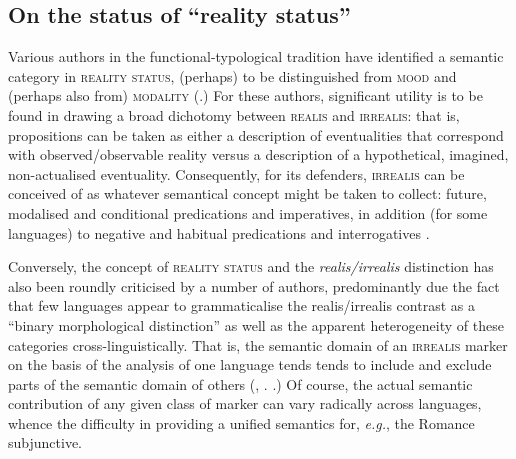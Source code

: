 \subsection{On the status of ``reality status''}
Various authors in the functional-typological tradition have identified a semantic category in \textsc{reality status}, (perhaps) to be distinguished from \textsc{mood} and (perhaps also from) \textsc{modality} (\citealp[see][]{Bowern1998,Elliott2000,Roberts1990a,Michael2014,McGregor2006,Mithun1995,Chafe1995}.) For these authors, significant utility is to be found in drawing a broad dichotomy between \textsc{realis} and \textsc{irrealis}: that is, propositions can be taken as either a description of eventualities that correspond with observed/observable reality versus a description of a hypothetical, imagined, non-actualised eventuality. Consequently, for its defenders, \textsc{irrealis} can be conceived of as whatever semantical concept might be taken to collect: future, modalised and conditional predications and imperatives, in addition (for some languages) to negative and habitual predications and interrogatives \citetext{\citealp[see also][]{Palmer2001,Givon1994,Plungian2005,VonPrincea}~under~revision}.

Conversely, the concept of \textsc{reality status} and the \textit{realis/irrealis} distinction has also been roundly criticised by a number of authors, predominantly due the fact that few languages appear to grammaticalise the realis/irrealis contrast as a ``binary morphological distinction'' as well as the apparent heterogeneity of these categories cross-linguistically. That is, the semantic domain of an \textsc{irrealis} marker on the basis of the analysis of one language tends tends to include and exclude parts of the semantic domain of others (\citealp[see][238]{Bybee1994}, \citealp[\textit{apud}][158\textit{ff}]{Foley1986}. \citealp[See also, \textit{e.g.},][]{Bybee1998,Portner2018a,Haan2012}.) Of course, the actual semantic contribution of any given class of marker can vary radically across languages, whence the difficulty in providing a unified semantics for, \textit{e.g.}, the Romance subjunctive.

